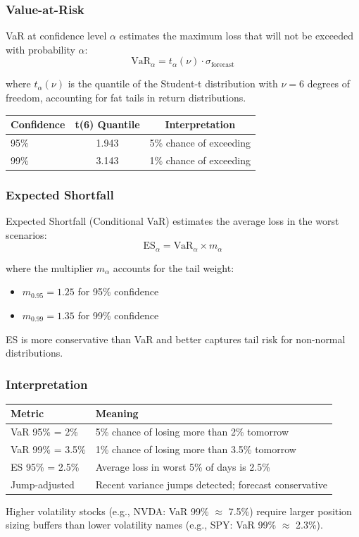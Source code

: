 \subsubsection{Value-at-Risk}

VaR at confidence level $\alpha$ estimates the maximum loss that will not be exceeded with probability $\alpha$:
\[
\text{VaR}_\alpha = t_\alpha(\nu) \cdot \sigma_{\text{forecast}}
\]

where $t_\alpha(\nu)$ is the quantile of the Student-t distribution with $\nu = 6$ degrees of freedom, accounting for fat tails in return distributions.

\begin{center}
\begin{tabular}{lcc}
\textbf{Confidence} & \textbf{t(6) Quantile} & \textbf{Interpretation} \\
\hline
95\% & 1.943 & 5\% chance of exceeding \\
99\% & 3.143 & 1\% chance of exceeding \\
\end{tabular}
\end{center}

\subsubsection{Expected Shortfall}

Expected Shortfall (Conditional VaR) estimates the average loss in the worst scenarios:
\[
\text{ES}_\alpha = \text{VaR}_\alpha \times m_\alpha
\]

where the multiplier $m_\alpha$ accounts for the tail weight:
\begin{itemize}
  \item $m_{0.95} = 1.25$ for 95\% confidence
  \item $m_{0.99} = 1.35$ for 99\% confidence
\end{itemize}

ES is more conservative than VaR and better captures tail risk for non-normal distributions.

\subsubsection{Interpretation}

\begin{center}
\begin{tabular}{ll}
\textbf{Metric} & \textbf{Meaning} \\
\hline
VaR 95\% = 2\% & 5\% chance of losing more than 2\% tomorrow \\
VaR 99\% = 3.5\% & 1\% chance of losing more than 3.5\% tomorrow \\
ES 95\% = 2.5\% & Average loss in worst 5\% of days is 2.5\% \\
Jump-adjusted & Recent variance jumps detected; forecast conservative \\
\end{tabular}
\end{center}

Higher volatility stocks (e.g., NVDA: VaR 99\% $\approx$ 7.5\%) require larger position sizing buffers than lower volatility names (e.g., SPY: VaR 99\% $\approx$ 2.3\%).

